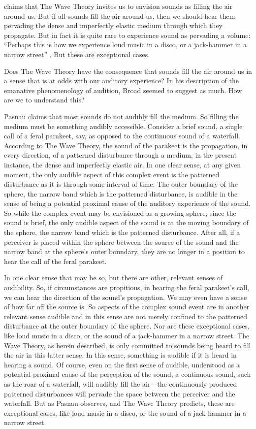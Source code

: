 \citet[section 6]{Pasnau:1999ss} claims that The Wave Theory invites us to envision sounds as filling the air around us. But if all sounds fill the air around us, then we should hear them pervading the dense and imperfectly elastic medium through which they propagate. But in fact it is quite rare to experience sound as pervading a volume: ``Perhaps this is how we experience loud music in a disco, or a jack-hammer in a narrow street'' \citep[312]{Pasnau:1999ss}. But these are exceptional cases.

Does The Wave Theory have the consequence that sounds fill the air around us in a sense that is at odds with our auditory experience? In his description of the emanative phenomenology of audition, Broad seemed to suggest as much. How are we to understand this? 

Pasnau claims that most sounds do not audibly fill the medium. So filling the medium must be something audibly accessible. Consider a brief sound, a single call of a feral parakeet, say, as opposed to the continuous sound of a waterfall. According to The Wave Theory, the sound of the parakeet is the propagation, in every direction, of a patterned disturbance through a medium, in the present instance, the dense and imperfectly elastic air. In one clear sense, at any given moment, the only audible aspect of this complex event is the patterned disturbance as it is through some interval of time. The outer boundary of the sphere, the narrow band which is the patterned disturbance, is audible in the sense of being a potential proximal cause of the auditory experience of the sound. So while the complex event may be envisioned as a growing sphere, since the sound is brief, the only audible aspect of the sound is at the moving boundary of the sphere, the narrow band which is the patterned disturbance. After all, if a perceiver is placed within the sphere between the source of the sound and the narrow band at the sphere's outer boundary, they are no longer in a position to hear the call of the feral parakeet. 

In one clear sense that may be so, but there are other, relevant senses of audibility. So, if circumstances are propitious, in hearing the feral parakeet's call, we can hear the direction of the sound's propagation. We may even have a sense of how far off the source is. So aspects of the complex sound event are in another relevant sense audible and in this sense are not merely confined to the patterned disturbance at the outer boundary of the sphere. Nor are these exceptional cases, like loud music in a disco, or the sound of a jack-hammer in a narrow street. The Wave Theory, as herein described, is only committed to sounds being heard to fill the air in this latter sense. In this sense, something is audible if it is heard in hearing a sound. Of course, even on the first sense of audible, understood as a potential proximal cause of the perception of the sound, a continuous sound, such as the roar of a waterfall, will audibly fill the air---the continuously produced patterned disturbances will pervade the space between the perceiver and the waterfall. But as Pasnau observes, and The Wave Theory predicts, these are exceptional cases, like loud music in a disco, or the sound of a jack-hammer in a narrow street.

